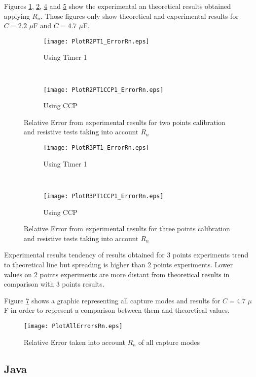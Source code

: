 Figures \ref{fig:PlotR2PT1ErrorRn}, \ref{fig:PlotR2PT1CCP1ErrorRn}, \ref{fig:PlotR3PT1ErrorRn} and \ref{fig:PlotR3PT1CCP1ErrorRn} show the experimental an theoretical results obtained applying $R_{n}$. Those figures only show theoretical and experimental results for $C=2.2$ $\mu$F and $C=4.7$ $\mu$F.
\medskip

\begin{figure}[!htb]
\centering
	\begin{subfigure}{0.45\textwidth}
	\texttt{[image: PlotR2PT1\_ErrorRn.eps]}
	\caption{Using Timer 1}
	\label{fig:PlotR2PT1ErrorRn}
	\end{subfigure}
	~
	\begin{subfigure}{0.45\textwidth}
	\texttt{[image: PlotR2PT1CCP1\_ErrorRn.eps]}
	\caption{Using CCP}
	\label{fig:PlotR2PT1CCP1ErrorRn}
	\end{subfigure}
\caption{Relative Error from experimental results for two points calibration and resistive tests taking into account $R_{n}$}
\label{fig:RelativeErrorRnResistive2P}
\end{figure}

\begin{figure}[!htb]
\centering
    \begin{subfigure}{0.45\textwidth}
	\texttt{[image: PlotR3PT1\_ErrorRn.eps]}
	\caption{Using Timer 1}
	\label{fig:PlotR3PT1ErrorRn}
	\end{subfigure}
	~
	\begin{subfigure}{0.45\textwidth}
	\texttt{[image: PlotR3PT1CCP1\_ErrorRn.eps]}
	\caption{Using CCP}
	\label{fig:PlotR3PT1CCP1ErrorRn}
	\end{subfigure}
\caption{Relative Error from experimental results for three points calibration and resistive tests taking into account $R_{n}$}
\label{fig:RelativeErrorRnResistive3P}
\end{figure}

Experimental results tendency of results obtained for 3 points experiments trend to theoretical line but spreading is higher than 2 points experiments. Lower values on 2 points experiments are more distant from theoretical results in comparison with 3 points results.
\medskip

Figure \ref{fig:PlotAllErrorsRn} shows a graphic representing all capture modes and results for $C=4.7$ $\mu$F in order to represent a comparison between them and theoretical values.

\begin{figure}[!htb]
\centering
\texttt{[image: PlotAllErrorsRn.eps]}
\caption{Relative Error taken into account $R_{n}$ of all capture modes}
\label{fig:PlotAllErrorsRn}
\end{figure}

\subsection{Java}\label{S:Res:Results:Java}